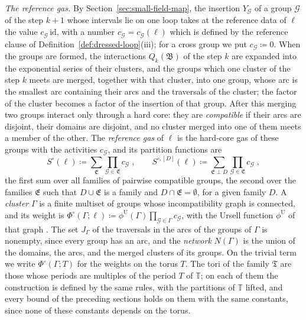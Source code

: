 \documentclass[11pt]{preprint}
\numberwithin{equation}{section}
\theoremstyle{definition}
\theoremstyle{remark}
\theoremstyle{plain}
\begin{document}
\emph{The reference gas.} By Section~\ref{sec:small-field-map}, the insertion $Y_{\mathcal G}$ of a group $\mathcal G$ of the step $k + 1$ whose intervals lie on one loop takes at the reference data of $\ell$ the value $c_{\mathcal G}\,\mathrm{id}$, with a number $c_{\mathcal G} = c_{\mathcal G}(\ell)$ which is defined by the reference clause of Definition~\ref{def:dressed-loop}(iii); for a cross group we put $c_{\mathcal G} \coloneqq 0$. When the groups are formed, the interactions $Q_k(\mathfrak B)$ of the step $k$ are expanded into the exponential series of their clusters, and the groups which one cluster of the step $k$ meets are merged, together with that cluster, into one group, whose arc is the smallest arc containing their arcs and the traversals of the cluster; the factor of the cluster becomes a factor of the insertion of that group. After this merging two groups interact only through a hard core: they are \emph{compatible} if their arcs are disjoint, their domains are disjoint, and no cluster merged into one of them meets a member of the other. The \emph{reference gas} of $\ell$ is the hard-core gas of these groups with the activities $c_{\mathcal G}$, and its partition functions are
\begin{equation}\label{eq:reference-partition}
    S^\circ(\ell) \coloneqq \sum_{\mathfrak E}\prod_{\mathcal G \in \mathfrak E}c_{\mathcal G}\;,
    \qquad
    S^{\circ,[D]}(\ell) \coloneqq \sum_{\mathfrak E \perp D}\prod_{\mathcal G \in \mathfrak E}c_{\mathcal G}\;,
\end{equation}
the first sum over all families of pairwise compatible groups, the second over the families $\mathfrak E$ such that $D \cup \mathfrak E$ is a family and $D \cap \mathfrak E = \emptyset$, for a given family $D$. A \emph{cluster} $\Gamma$ is a finite multiset of groups whose incompatibility graph is connected, and its weight is $\Phi^\circ(\Gamma; \ell) \coloneqq \phi^{\mathrm U}(\Gamma)\prod_{\mathcal G \in \Gamma}c_{\mathcal G}$, with the Ursell function $\phi^{\mathrm U}$ of that graph \cite[Chapter~5]{FriedliVelenik}. The set $J_\Gamma$ of the traversals in the arcs of the groups of $\Gamma$ is nonempty, since every group has an arc, and the \emph{network} $N(\Gamma)$ is the union of the domains, the arcs, and the merged clusters of its groups. On the trivial term we write $\Phi^\circ(\Gamma; T)$ for the weights on the torus $T$. The tori of the family $\mathfrak T$ are those whose periods are multiples of the period $T$ of $\mathbb T$; on each of them the construction is defined by the same rules, with the partitions of $\mathbb T$ lifted, and every bound of the preceding sections holds on them with the same constants, since none of these constants depends on the torus.
\end{document}
